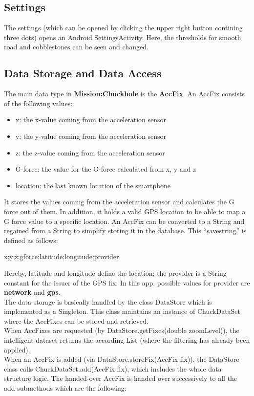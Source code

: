 \documentclass[10pt,a4paper]{article} %
\begin{document}
		
	\subsection{Settings}

	The settings (which can be opened by clicking the upper right button contining three dots) opens an Android SettingsActivity.
	Here, the thresholds for smooth road and cobblestones can be seen and changed.




	\subsection{Data Storage and Data Access}\label{subsec:datastorage}

	The main data type in \textbf{Mission:Chuckhole} is the \textbf{AccFix}.
	An AccFix consists of the following values:

	\begin{itemize}
		\item x: the x-value coming from the acceleration sensor
		\item y: the y-value coming from the acceleration sensor
		\item z: the z-value coming from the acceleration sensor
		\item G-force: the value for the G-force calculated from x, y and z
		\item location: the last known location of the smartphone
	\end{itemize}

	It stores the values coming from the acceleration sensor and calculates the G force out of them.
	In addition, it holds a valid GPS location to be able to map a G force value to a specific location.
	An AccFix can be converted to a String and regained from a String to simplify storing it in the database.
	This ``savestring'' is defined as follows:

	\begin{center}
		x;y;z;gforce;latitude;longitude;provider
	\end{center}
	
	Hereby, latitude and longitude define the location; the provider is a String constant for the issuer of the GPS fix.
	In this app, possible values for provider are \textbf{network} and \textbf{gps}.\\

	The data storage is basically handled by the class DataStore which is implemented as a Singleton.
	This class maintains an instance of ChuckDataSet where the AccFixes can be stored and retrieved.\\
	When AccFixes are requested (by DataStore.getFixes(double zoomLevel)), the intelligent dataset returns the according List (where the filtering has already been applied).\\
	When an AccFix is added (via DataStore.storeFix(AccFix fix)), the DataStore class calls ChuckDataSet.add(AccFix fix), which includes the whole data structure logic.
	The handed-over AccFix is handed over successively to all the add-submethods which are the following: %
\end{document}
